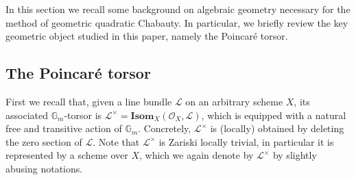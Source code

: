 \documentclass[11pt,oneside]{amsart}
\theoremstyle{plain}
\theoremstyle{definition}
\def\G{{\bf G}}
\DeclareMathOperator{\Gm}{\mathbb{G}_m}
\def\G{\mathbb{G}}
\def\Gm{{\mathbb{G}_m}}
\def\oh{\mathcal{O}}
\begin{document}
In this section we recall some background on algebraic geometry necessary for the method of geometric quadratic Chabauty. In particular, we briefly review the key geometric object studied in this paper, namely the Poincar\'e torsor. 


\subsection{The Poincar\'e torsor}\label{S:PicTors}

\color{black}

First we recall that, given a line bundle $\mathscr{L}$ on an arbitrary scheme $X$, its associated $\Gm$-torsor is $\mathscr{L}^\times = \textbf{Isom}_X (\oh_X, \mathscr L)$, which is equipped with a natural free and transitive  action of $\Gm$. Concretely, $\mathscr{L}^\times$ is (locally) obtained by deleting the zero section of $\mathscr L$. %
Note that $\mathscr L^\times$ is Zariski locally trivial, in particular it is represented by a scheme over $X$, which we again denote by $\mathscr L^\times$ by slightly abusing notations. 
\end{document}
